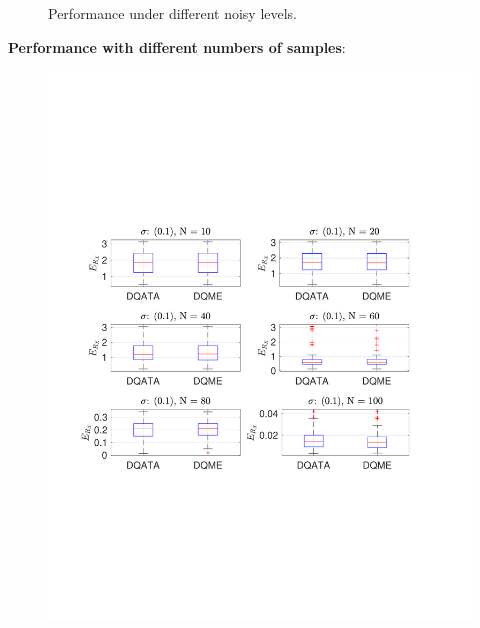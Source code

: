 \begin{figure}
\caption{Performance under different noisy levels.}
\end{figure}

\textbf{Performance with different numbers of samples}:
\begin{figure}
\centering
\includegraphics[scale=0.6]{./hand_eye_figures/dq/dq_er_cmp_num}

\end{figure}
